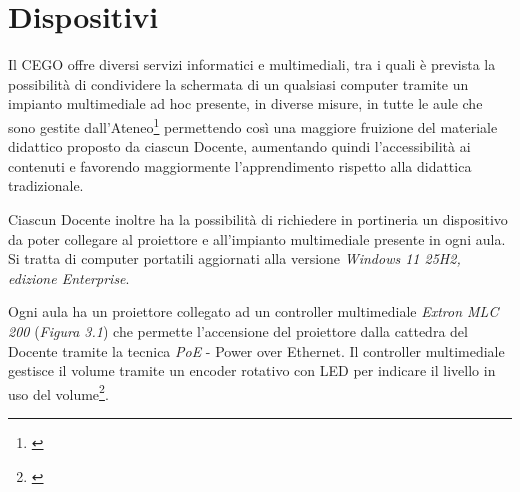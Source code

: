 \setcounter{chapter}{2}
\setcounter{section}{0}

\chapter{Dispositivi}
    \par
        Il CEGO offre diversi servizi informatici e multimediali, tra i quali è prevista la possibilità di condividere la schermata di un qualsiasi computer tramite un impianto multimediale ad hoc presente, in diverse misure, in tutte le aule che sono gestite dall'Ateneo\footnote{\cite{AuleMultimedialiVideotutorial}} permettendo così una maggiore fruizione del materiale didattico proposto da ciascun Docente, aumentando quindi l'accessibilità ai contenuti e favorendo maggiormente l'apprendimento rispetto alla didattica tradizionale. 
    \par
        Ciascun Docente inoltre ha la possibilità di richiedere in portineria un dispositivo da poter collegare al proiettore e all'impianto multimediale presente in ogni aula. Si tratta di computer portatili aggiornati alla versione \textsl{Windows 11 25H2, edizione Enterprise}.
    \par
        Ogni aula ha un proiettore collegato ad un controller multimediale \textsl{Extron MLC 200} (\textit{Figura 3.1}) che permette l'accensione del proiettore dalla cattedra del Docente tramite la tecnica \textsl{PoE} - Power over Ethernet. 
        Il controller multimediale gestisce il volume tramite un encoder rotativo con LED per indicare il livello in uso del volume\footnote{\cite{MLC200MediaLink}}.  
